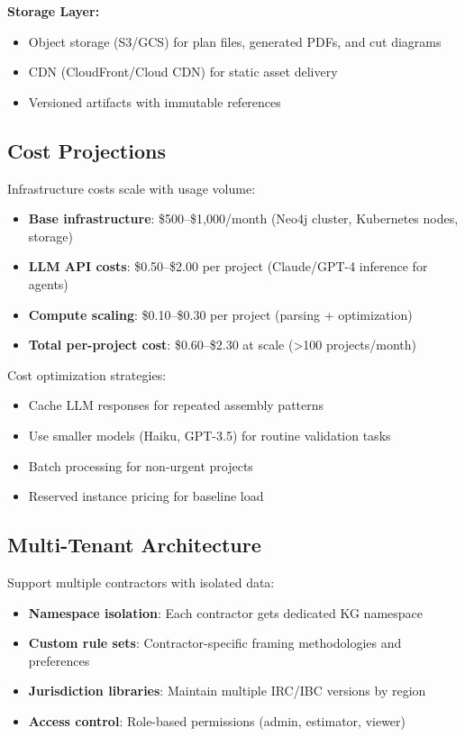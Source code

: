 \textbf{Storage Layer:}
\begin{itemize}
  \item Object storage (S3/GCS) for plan files, generated PDFs, and cut diagrams
  \item CDN (CloudFront/Cloud CDN) for static asset delivery
  \item Versioned artifacts with immutable references
\end{itemize}

\subsection{Cost Projections}

Infrastructure costs scale with usage volume:

\begin{itemize}
  \item \textbf{Base infrastructure}: \$500--\$1,000/month (Neo4j cluster, Kubernetes nodes, storage)
  \item \textbf{LLM API costs}: \$0.50--\$2.00 per project (Claude/GPT-4 inference for agents)
  \item \textbf{Compute scaling}: \$0.10--\$0.30 per project (parsing + optimization)
  \item \textbf{Total per-project cost}: \$0.60--\$2.30 at scale (>100 projects/month)
\end{itemize}

Cost optimization strategies:
\begin{itemize}
  \item Cache LLM responses for repeated assembly patterns
  \item Use smaller models (Haiku, GPT-3.5) for routine validation tasks
  \item Batch processing for non-urgent projects
  \item Reserved instance pricing for baseline load
\end{itemize}

\subsection{Multi-Tenant Architecture}

Support multiple contractors with isolated data:
\begin{itemize}
  \item \textbf{Namespace isolation}: Each contractor gets dedicated KG namespace
  \item \textbf{Custom rule sets}: Contractor-specific framing methodologies and preferences
  \item \textbf{Jurisdiction libraries}: Maintain multiple IRC/IBC versions by region
  \item \textbf{Access control}: Role-based permissions (admin, estimator, viewer)
\end{itemize}

